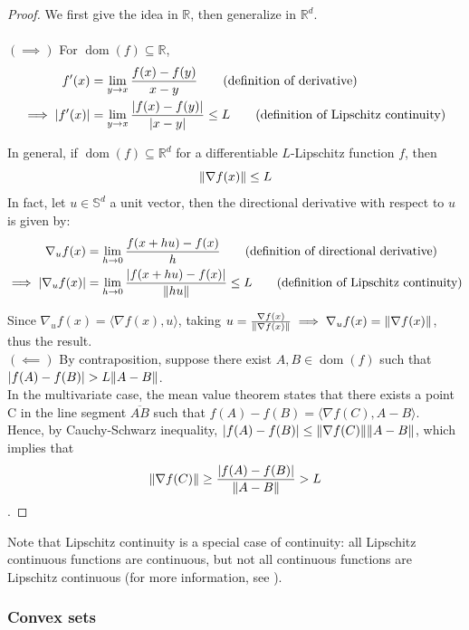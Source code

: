 \documentclass{article}
\DeclareMathOperator*{\dom}{dom}
\newcommand{\R}{\mathbb{R}}
\DeclarePairedDelimiter{\abs}{\lvert}{\rvert}
\DeclarePairedDelimiter{\norm}{\lVert}{\rVert}
\begin{document}
\begin{proof}
We first give the idea in $\R$, then generalize in $\R^d$.\\\\
$(\implies)$
For $\dom(f)\subseteq\R$,
\begin{align*}
	f'(x) &= \lim_{y\to x} \frac{f(x)-f(y)}{x-y} \tag{definition of derivative}\\
	\implies \abs{f'(x)} &= \lim_{y\to x} \frac{\abs{f(x)-f(y)}}{\abs{x-y}} \leq L \tag{definition of Lipschitz continuity}
\end{align*}

In general, if $\dom(f)\subseteq \R^d$ for a differentiable $L$-Lipschitz function $f$, then
\[
    \norm{\nabla f(x)} \leq L
\]
In fact, let $u\in\mathbb{S}^d$ a unit vector, then the directional derivative with respect to $u$ is given by:
\begin{align*}
	\nabla_u f(x) &= \lim_{h\to 0} \frac{f(x+hu)-f(x)}{h} \tag{definition of directional derivative}\\
	\implies \abs{\nabla_u f(x)} &= \lim_{h\to 0} \frac{\abs{f(x+hu)-f(x)}}{\norm{hu}} \leq L \tag{definition of Lipschitz continuity}
\end{align*}

Since  $\nabla_u f(x)=\langle\nabla f(x),u\rangle$, taking $u=\frac{\nabla f(x)}{\norm{\nabla f(x)}} \implies \nabla_u f(x)=\norm{\nabla f(x)}$, thus the result.\\


$(\impliedby)$ By contraposition, suppose there exist $A,B\in \dom(f)$ such that $|f(A)-f(B)|>L\norm{A-B}$.\\

In the multivariate case, the mean value theorem states that there exists a point C in the line segment $\overline{AB}$ such that $f(A)-f(B)= \langle\nabla f(C), A-B \rangle$.\\
Hence, by Cauchy-Schwarz inequality, $|f(A)-f(B)|\leq \norm{\nabla f(C)} \norm{A-B}$, which implies that $$\norm{\nabla f(C)}\geq \frac{|f(A)-f(B)|}{\norm{A-B}}> L$$.

\end{proof}{}

Note that Lipschitz continuity is a special case of continuity: all Lipschitz continuous functions are continuous, but not all continuous functions are Lipschitz continuous (for more information, see \cite{boyd2004convex}).



\subsubsection{Convex sets}
\end{document}
